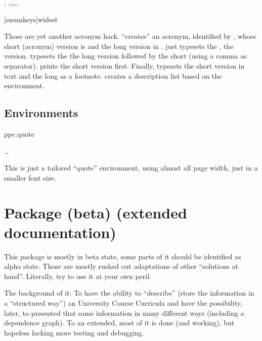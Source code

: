 \documentclass[article,nogeometry,english,tocdepth=3,secdepth=3]{ufrgscca} %
\begin{document}
\begin{codedescribe}{\acrodef, \acro,\acrol,\acrols,\acrosl,\acrofoot,\printacrolist}
    \begin{codesyntax}%
        \tsmacro{\printacrolist}[enumkeys]{widest}
    \end{codesyntax}
Those are yet another acronym hack. \tsmacro{\acrodef}{} “creates” an acronym, identified by , whose short (acronym) version is  and the long version in . \tsmacro{\acro}{} just typesets the , \tsmacro{\acrol}{} the  version.
\tsmacro{\acrols}{} typesets the the long version followed by the short (using a comma as separator).
\tsmacro{\acrosl}{} prints the short version first. Finally, \tsmacro{\acrofoot}{} typesets the short version in text and the long as a footnote. \tsmacro{\printacrolist}{} creates a description list based on the  environment.
\end{codedescribe}

\subsection{Environments}
\begin{codedescribe}[env]{ppc.quote}
    \begin{codesyntax}%
    \tsmacro{\begin{ppc.quote}}{} \ldots \tsmacro{\end{ppc.quote}}{}
    \end{codesyntax}
\end{codedescribe}
This is just a tailored “quote” environment, using almost all page width, just in a smaller font size.

\section{ Package (beta) (extended documentation)}
This package is mostly in beta state, some parts of it should be identified as  alpha state. Those are mostly rushed out adaptations of other “solutions at hand”. Literally, try to use it at your own peril.

The background of it: To have the ability to “describe” (store the information in a “structured way”) an University Course Curricula and  have the possibility, later, to presented that same information in many different ways (including a dependence graph). To an extended, most of it is done (and working), but hopeless lacking more testing and debugging.
\end{document}

